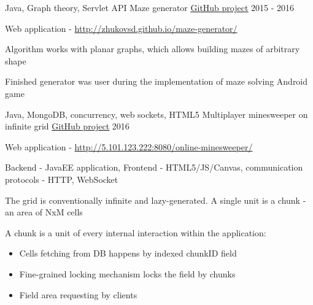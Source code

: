 

\begin{cventries}

  \cventry
    {Java, Graph theory, Servlet API}
    {Maze generator}
    {\color{awesome-skyblue}\href{https://github.com/zhukovsd/maze-generator}{\underline{GitHub project}}}
    {2015 - 2016}
    {
      \begin{cvitems} %
        \item {Web application - \href{http://zhukovsd.github.io/maze-generator/}{http://zhukovsd.github.io/maze-generator/}}
        \item {Algorithm works with planar graphs, which allows building mazes of arbitrary shape}
        \item Finished generator was user during the implementation of maze solving Android game
      \end{cvitems}
    }

  \cventry
    {Java, MongoDB, concurrency, web sockets, HTML5}
    {Multiplayer minesweeper on infinite grid}
    {\color{awesome-skyblue}\href{https://github.com/zhukovsd/endless-field}{\underline{GitHub project}}}
    {2016}
    {
      \begin{cvitems} %
        \item {Web application - \href{http://5.101.123.222:8080/online-minesweeper/}{http://5.101.123.222:8080/online-minesweeper/}}
        \item {Backend - JavaEE application, Frontend - HTML5/JS/Canvas, communication protocols - HTTP, WebSocket}
        \item {The grid is conventionally infinite and lazy-generated. A single unit is a chunk - an area of NxM cells}
        \item A chunk is a unit of every internal interaction within the application:
        \begin{itemize}
			\item Cells fetching from DB happens by indexed chunkID field
			\item Fine-grained locking mechanism locks the field by chunks
            \item Field area requesting by clients
		\end{itemize}
      \end{cvitems}
    }
\end{cventries}
